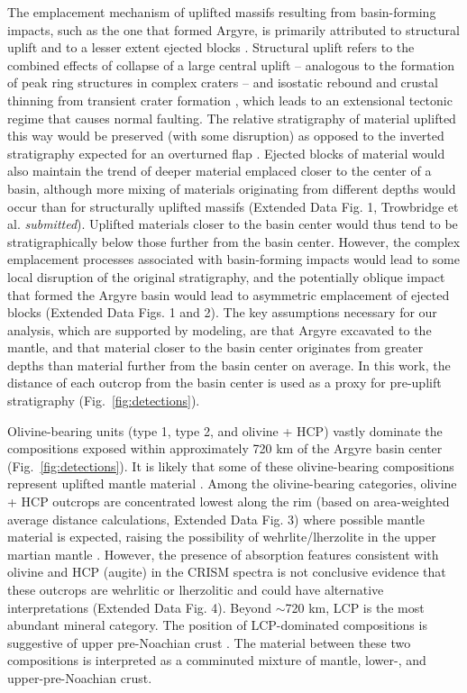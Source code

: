 \documentclass[12pt]{article}
\begin{document}
The emplacement mechanism of uplifted massifs resulting from basin-forming impacts, such as the one that formed Argyre, is primarily attributed to structural uplift \citep{Tanaka1995,Johnson2016} and to a lesser extent ejected blocks \citep{Johnson2016}. Structural uplift refers to the combined effects of collapse of a large central uplift – analogous to the formation of peak ring structures in complex craters \citep{Johnson2016} – and isostatic rebound and crustal thinning from transient crater formation \citep{Tanaka1995}, which leads to an extensional tectonic regime that causes normal faulting. The relative stratigraphy of material uplifted this way would be preserved (with some disruption) as opposed to the inverted stratigraphy expected for an overturned flap \citep{Kenkmann2014}. Ejected blocks of material would also maintain the trend of deeper material emplaced closer to the center of a basin, although more mixing of materials originating from different depths would occur than for structurally uplifted massifs (Extended Data Fig. 1, Trowbridge et al. \textit{submitted}). Uplifted materials closer to the basin center would thus tend to be stratigraphically below those further from the basin center. However, the complex emplacement processes associated with basin-forming impacts would lead to some local disruption of the original stratigraphy, and the potentially oblique impact that formed the Argyre basin would lead to asymmetric emplacement of ejected blocks (Extended Data Figs. 1 and 2). The key assumptions necessary for our analysis, which are supported by modeling, are that Argyre excavated to the mantle, and that material closer to the basin center originates from greater depths than material further from the basin center on average. In this work, the distance of each outcrop from the basin center is used as a proxy for pre-uplift stratigraphy (Fig.~\ref{fig:detections}).

Olivine-bearing units (type 1, type 2, and olivine + HCP) vastly dominate the compositions exposed within approximately 720 km of the Argyre basin center (Fig.~\ref{fig:detections}). It is likely that some of these olivine-bearing compositions represent uplifted mantle material \citep[Extended Data Fig. 1;][]{Koeppen2008, Ody2013}. Among the olivine-bearing categories, olivine + HCP outcrops are concentrated lowest along the rim (based on area-weighted average distance calculations, Extended Data Fig. 3) where possible mantle material is expected, raising the possibility of wehrlite/lherzolite in the upper martian mantle \citep{McGetchin1978, Treiman2025, Bernadet2025}. However, the presence of absorption features consistent with olivine and HCP (augite) in the CRISM spectra is not conclusive evidence that these outcrops are wehrlitic or lherzolitic and could have alternative interpretations (Extended Data Fig. 4).  Beyond $\sim$720 km, LCP is the most abundant mineral category. The position of LCP-dominated compositions is suggestive of upper pre-Noachian crust \citep{Buczkowski2010, McNeil2025}. The material between these two compositions is interpreted as a comminuted mixture of mantle, lower-, and upper-pre-Noachian crust. 
\end{document}
